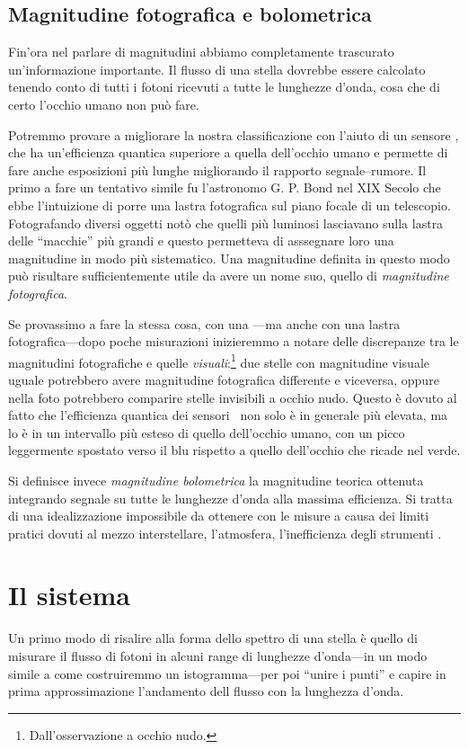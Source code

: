     \subsection{Magnitudine fotografica e bolometrica}
        Fin'ora nel parlare di magnitudini abbiamo completamente trascurato un'informazione importante. Il flusso di una stella dovrebbe essere calcolato tenendo conto di tutti i fotoni ricevuti a tutte le lunghezze d'onda, cosa che di certo l'occhio umano non può fare.
        
        Potremmo provare a migliorare la nostra classificazione con l'aiuto di un sensore \ccd, che ha un'efficienza quantica superiore a quella dell'occhio umano e permette di fare anche esposizioni più lunghe migliorando il rapporto segnale--rumore. Il primo a fare un tentativo simile fu l'astronomo G. P. Bond nel XIX Secolo che ebbe l'intuizione di porre una lastra fotografica sul piano focale di un telescopio. Fotografando diversi oggetti notò che quelli più luminosi lasciavano sulla lastra delle ``macchie'' più grandi e questo permetteva di asssegnare loro una magnitudine in modo più sistematico. Una magnitudine definita in questo modo può risultare sufficientemente utile da avere un nome suo, quello di \emph{magnitudine fotografica}.

        Se provassimo a fare la stessa cosa, con una \ccd---ma anche con una lastra fotografica---dopo poche misurazioni inizieremmo a notare delle discrepanze tra le magnitudini fotografiche e quelle \emph{visuali}:\footnote{Dall'osservazione a occhio nudo.} due stelle con magnitudine visuale uguale potrebbero avere magnitudine fotografica differente e viceversa, oppure nella foto potrebbero comparire stelle invisibili a occhio nudo. Questo è dovuto al fatto che l'efficienza quantica dei sensori \ccd\ non solo è in generale più elevata, ma lo è in un intervallo più esteso di quello dell'occhio umano, con un picco leggermente spostato verso il blu rispetto a quello dell'occhio che ricade nel verde.

        Si definisce invece \emph{magnitudine bolometrica} la magnitudine teorica ottenuta integrando segnale su tutte le lunghezze d'onda alla massima efficienza. Si tratta di una idealizzazione impossibile da ottenere con le misure a causa dei limiti pratici dovuti al mezzo interstellare, l'atmosfera, l'inefficienza degli strumenti \myetc.
\section{Il sistema \ubvri}
    Un primo modo di risalire alla forma dello spettro di una stella è quello di misurare il flusso di fotoni in alcuni range di lunghezze d'onda---in un modo simile a come costruiremmo un istogramma---per poi ``unire i punti'' e capire in prima approssimazione l'andamento dell flusso con la lunghezza d'onda.
